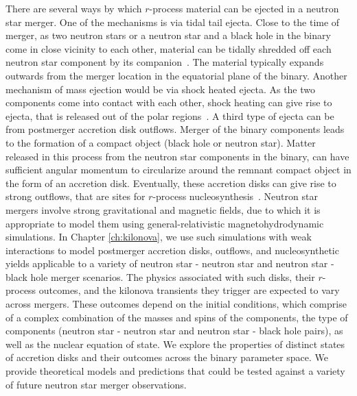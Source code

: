 There are several ways by which $r$-process material can be ejected in a neutron star merger. One of the mechanisms is via tidal tail ejecta. Close to the time of merger, as two neutron stars or a neutron star and a black hole in the binary come in close vicinity to each other, material can be tidally shredded off each neutron star component by its companion~\cite{Davies:1993zn,Ruffert:1996by,Rosswog:1998hy}. The material typically expands outwards from the merger location in the equatorial plane of the binary. Another mechanism of mass ejection would be via shock heated ejecta. As the two components come into contact with each other, shock heating can give rise to ejecta, that is released out of the polar regions~\cite{Oechslin:2006,PhysRevD.87.024001,Bauswein:2013jpa}. A third type of ejecta can be from postmerger accretion disk outflows. Merger of the binary components leads to the formation of a compact object (black hole or neutron star). Matter released in this process from the neutron star components in the binary, can have sufficient angular momentum to circularize around the remnant compact object in the form of an accretion disk. Eventually, these accretion disks can give rise to strong outflows, that are sites for $r$-process nucleosynthesis~\cite{Metzger:2008av,Dessart:2008zd}. Neutron star mergers involve strong gravitational and magnetic fields, due to which it is appropriate to model them using general-relativistic magnetohydrodynamic simulations. In Chapter \ref{ch:kilonova}, we use such simulations with weak interactions to model postmerger accretion disks, outflows, and nucleosynthetic yields applicable to a variety of neutron star - neutron star and neutron star - black hole merger scenarios. The physics associated with such disks, their $r$-process outcomes, and the kilonova transients they trigger are expected to vary across mergers. These outcomes depend on the initial conditions, which comprise of a complex combination of the masses and spins of the components, the type of components (neutron star - neutron star and neutron star - black hole pairs), as well as the nuclear equation of state. We explore the properties of distinct states of accretion disks and their outcomes across the binary parameter space. We provide theoretical models and predictions that could be tested against a variety of future neutron star merger observations.